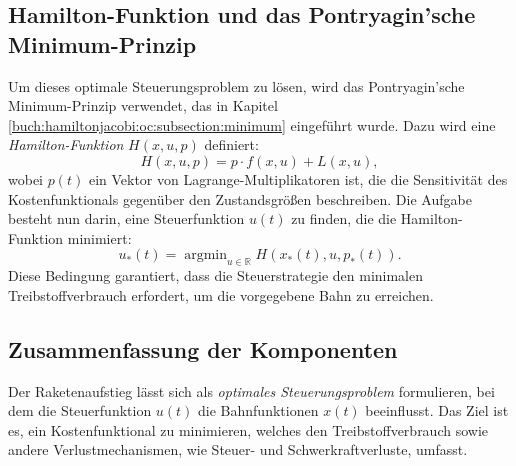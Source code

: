 \subsection{Hamilton-Funktion und das Pontryagin’sche Minimum-Prinzip}

Um dieses optimale Steuerungsproblem zu lösen, wird das Pontryagin'sche Minimum-Prinzip verwendet, das in Kapitel \ref{buch:hamiltonjacobi:oc:subsection:minimum} eingeführt wurde. Dazu wird eine \textit{Hamilton-Funktion} \(H(x,u,p)\) definiert:
\[
H(x,u,p) = p \cdot f(x,u) + L(x,u),
\]
wobei \(p(t)\) ein Vektor von Lagrange-Multiplikatoren ist, die die Sensitivität des Kostenfunktionals gegenüber den Zustandsgrößen beschreiben. Die Aufgabe besteht nun darin, eine Steuerfunktion \(u(t)\) zu finden, die die Hamilton-Funktion minimiert:
\[
u_*(t) = \operatorname{argmin}_{u \in \mathbb{R}} H(x_*(t), u, p_*(t)).
\]
Diese Bedingung garantiert, dass die Steuerstrategie den minimalen Treibstoffverbrauch erfordert, um die vorgegebene Bahn zu erreichen.

\subsection{Zusammenfassung der Komponenten}
%
%

Der Raketenaufstieg lässt sich als \textit{optimales Steuerungsproblem} formulieren, bei dem die Steuerfunktion \( u(t) \) die Bahnfunktionen \( x(t) \) beeinflusst. Das Ziel ist es, ein Kostenfunktional zu minimieren, welches den Treibstoffverbrauch sowie andere Verlustmechanismen, wie Steuer- und Schwerkraftverluste, umfasst.

